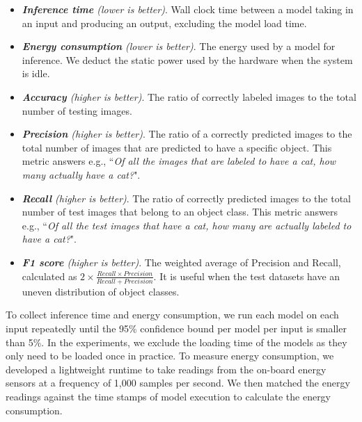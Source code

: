 \begin{itemize}
\item \emph{\textbf{Inference time} (lower is better)}. Wall clock time between a model taking in an input and producing an output,
    excluding the model load time.

\item \emph{\textbf{Energy consumption} (lower is better)}. The energy used by a model for inference.  We deduct the static power used by
    the hardware when the system is idle.

\item \emph{\textbf{Accuracy} (higher is better)}. The ratio of correctly labeled images to the total number of testing images.

\item \emph{\textbf{Precision} (higher is better)}. The ratio of a correctly predicted images to the total number of images that are
    predicted to have a specific object. This metric answers e.g., ``\emph{Of all the images that are labeled to have a cat, how many
    actually have a cat?}".

\item \emph{\textbf{Recall} (higher is better)}. The ratio of correctly predicted images to the total number of test images that belong
    to an object class. This metric answers e.g., ``\emph{Of all the test images that have a cat, how many are actually labeled to have a
    cat?}".

\item \emph{\textbf{F1 score} (higher is better)}.  The weighted average of Precision and Recall, calculated as $2\times\frac{Recall
    \times Precision} {Recall + Precision}$. It is useful when the test datasets have an uneven distribution of object classes.

\end{itemize}

  To collect inference time and energy consumption, we run each model on each input repeatedly until the
95\% confidence bound per model per input is smaller than 5\%. In the experiments, we exclude the loading time of the \CNN models as they
only need to be loaded once in practice. To measure energy consumption, we developed a lightweight runtime to take readings from the
on-board energy sensors at a frequency of 1,000 samples per second. We then matched the energy readings against the time stamps of model
execution to calculate the energy consumption.
